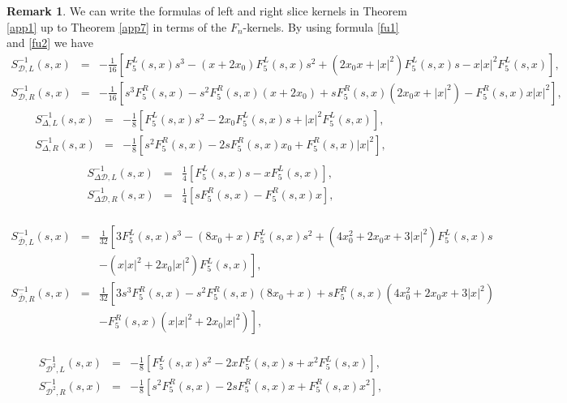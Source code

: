 \documentclass[reqno,11pt]{amsart}
\numberwithin{equation}{section}
\theoremstyle{definition}
\newtheorem{remark}[theorem]{{\bf Remark}}
\begin{document}
\begin{remark}\label{fkernels}
We can write the formulas of left and right slice kernels in Theorem \ref{app1} up to Theorem \ref{app7} in terms of the $F_n$-kernels. By using  formula \eqref{fu1} and \eqref{fu2} we have
\begin{eqnarray*}
S^{-1}_{\mathcal D,L}(s,x)&=&-\frac 1{16}\left[F^L_5(s,x)s^3-(x+2x_0)F^L_5(s,x)s^2+(2x_0x+|x|^2)F^L_5(s,x)s-x|x|^2F^L_5(s,x)\right],\\
S^{-1}_{\mathcal D,R}(s,x)&=&-\frac 1{16}\left[s^3F^R_5(s,x)-s^2F^R_5(s,x)(x+2x_0)+sF^R_5(s,x)(2x_0x+|x|^2)-F^R_5(s,x)x|x|^2\right],
\end{eqnarray*}
\begin{eqnarray*}
S^{-1}_{\Delta,L}(s,x)&=&-\frac 1{8}\left[ F^L_5(s,x)s^2-2x_0F^L_5(s,x)s+|x|^2F^L_5(s,x) \right],\\
S^{-1}_{\Delta,R}(s,x)&=&-\frac 1{8}\left[ s^2F^R_5(s,x)-2sF^R_5(s,x)x_0+F^R_5(s,x)|x|^2 \right],\\
\end{eqnarray*}
\begin{eqnarray*}
S^{-1}_{\Delta\mathcal D,L}(s,x)&=&\frac {1}{4}\left[F^{L}_5(s,x)s-xF^L_5(s,x)\right],\\
S^{-1}_{\Delta\mathcal D,R}(s,x)&=&\frac {1}{4}\left[sF^{R}_5(s,x)-F^R_5(s,x)x\right],\\
\end{eqnarray*}

\begin{eqnarray*}
S^{-1}_{\overline{\mathcal D},L}(s,x)&=& \frac 1{32}\left[3F^L_5(s,x)s^3-(8x_0+x)F^L_5(s,x)s^2+(4x_0^2+2x_0x+3|x|^2)F^L_5(s,x)s\right.\\
&&\left.-(x|x|^2+2x_0|x|^2)F^L_5(s,x)\right],\\
S^{-1}_{\overline{\mathcal D},R}(s,x)&=& \frac 1{32}\left[3s^3F^R_5(s,x)-s^2F^R_5(s,x)(8x_0+x)+sF^R_5(s,x)(4x_0^2+2x_0x+3|x|^2)\right.\\
&&\left.-F^R_5(s,x)(x|x|^2+2x_0|x|^2)\right],\\
\end{eqnarray*}

\begin{eqnarray*}
S^{-1}_{\mathcal{D}^2,L}(s,x)&=&-\frac 1{8}\left[F^L_5(s,x)s^2-2x F^L_5(s,x)s+x^2F^L_5(s,x)\right],\\
S^{-1}_{\mathcal{D}^2,R}(s,x)&=&-\frac 1{8}\left[s^2F^R_5(s,x)-2 sF^R_5(s,x)x+F^R_5(s,x)x^2\right],\\
\end{eqnarray*}


\end{remark}
\end{document}
